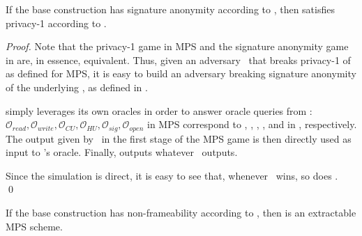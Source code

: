 \begin{theorem}
  If the base \CUASGen construction has signature anonymity according to
  , then \CUASMPS satisfies privacy-1
  according to \cite{ngsy22}.
\end{theorem}

\begin{proof}  
  Note that the privacy-1 game in MPS and the signature anonymity game in \UAS
  are, in essence, equivalent. Thus, given an adversary \adv~that breaks
  privacy-1 of \CUASMPS as defined for MPS, it is easy to build an adversary
  \advB breaking signature anonymity of the underlying \CUASGen, as defined in
  \UAS.

  \advB simply leverages its own oracles in order to answer oracle queries from
  \adv: $\mathcal{O}_{read},\mathcal{O}_{write},\mathcal{O}_{CU},\mathcal{O}_{HU},
  \mathcal{O}_{sig},\mathcal{O}_{open}$ in MPS correspond to \RREG, \WREG,
  \CUGEN, \HUGEN, \SIGN and \OPEN in \UAS, respectively. The output given by
  \adv~in the first stage of the MPS game is then directly used as input to
  \advB's \CHALb oracle. Finally, \advB outputs whatever \adv~outputs.

  Since the simulation is direct, it is easy to see that, whenever \adv~wins,
  so does \advB.
  \qed
\end{proof}

\begin{theorem}
  If the base \CUASGen construction has non-frameability according to
  , then \CUASMPS is an extractable MPS scheme.
\end{theorem}

